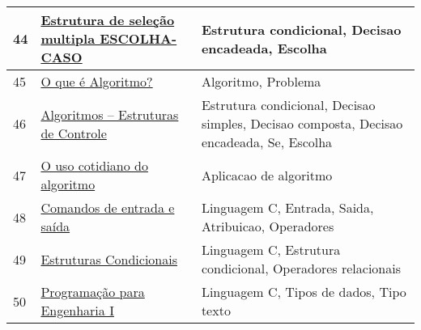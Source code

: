 \begin{longtable}{| p{} | p{} | p{} |}
44  & \href{http://www.dicasdeprogramacao.com.br/estrutura-de-selecao-multipla-escolha-caso/}{\color{blue} Estrutura de seleção multipla ESCOLHA-CASO                                          } & Estrutura condicional, Decisao encadeada, Escolha                                                                                                 \\ \hline
45  & \href{http://www.dicasdeprogramacao.com.br/o-que-e-algoritmo/}{\color{blue} O que é Algoritmo?                                                                  } & Algoritmo, Problema                                                                                                                               \\ \hline
46  & \href{http://www.din.uem.br/~teclopes/FCaula5.pdf}{\color{blue} Algoritmos – Estruturas de Controle                                                 } & Estrutura condicional, Decisao simples, Decisao composta, Decisao encadeada, Se, Escolha                                                          \\ \hline
47  & \href{http://www.gazetadopovo.com.br/vida-e-cidadania/o-uso-cotidiano-do-algoritmo-4x3n9sw4bkhoam6fzqcp27mfi}{\color{blue} O uso cotidiano do algoritmo                                                        } & Aplicacao de algoritmo                                                                                                                            \\ \hline
48  & \href{http://www.ic.unicamp.br/~sheila/mc102/02\_Entrada\%20Saida\%20e\%20Operadores.pdf}{\color{blue} Comandos de entrada e saída                                                         } & Linguagem C, Entrada, Saida, Atribuicao, Operadores                                                                                               \\ \hline
49  & \href{http://www.ic.unicamp.br/~wainer/cursos/2s2011/Cap05-EstruturasCondicionais-texto.pdf}{\color{blue} Estruturas Condicionais                                                             } & Linguagem C, Estrutura condicional, Operadores relacionais                                                                                        \\ \hline
50  & \href{http://www.inf.pucrs.br/~benso/progi/guia.htm}{\color{blue} Programação para Engenharia I                                                       } & Linguagem C, Tipos de dados, Tipo texto                                                                                                           \\ \hline

\end{longtable}

